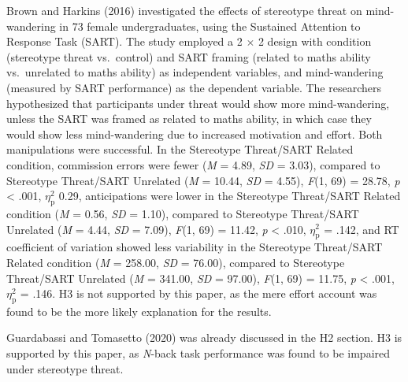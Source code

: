 \documentclass[
  stu, a4paper, 12pt,mask,floatsintext]{apa7}
\begin{document}
Brown and Harkins (2016) investigated the effects of stereotype threat on mind-wandering in 73 female undergraduates, using the Sustained Attention to Response Task (SART).
The study employed a 2 \(\times\) 2 design with condition (stereotype threat vs.~control) and SART framing (related to maths ability vs.~unrelated to maths ability) as independent variables, and mind-wandering (measured by SART performance) as the dependent variable. The researchers hypothesized that participants under threat would show more mind-wandering, unless the SART was framed as related to maths ability, in which case they would show less mind-wandering due to increased motivation and effort.
Both manipulations were successful.
In the Stereotype Threat/SART Related condition, commission errors were fewer (\emph{M} = 4.89, \emph{SD} = 3.03), compared to Stereotype Threat/SART Unrelated (\emph{M} = 10.44, \emph{SD} = 4.55), \emph{F}(1, 69) = 28.78, \emph{p} \textless{} .001, \(\eta^{2}_{\text{p}}\) 0.29, anticipations were lower in the Stereotype Threat/SART Related condition (\emph{M} = 0.56, \emph{SD} = 1.10), compared to Stereotype Threat/SART Unrelated (\emph{M} = 4.44, \emph{SD} = 7.09), \emph{F}(1, 69) = 11.42, \emph{p} \textless{} .010, \(\eta^{2}_{\text{p}}\) = .142, and RT coefficient of variation showed less variability in the Stereotype Threat/SART Related condition (\emph{M} = 258.00, \emph{SD} = 76.00), compared to Stereotype Threat/SART Unrelated (\emph{M} = 341.00, \emph{SD} = 97.00), \emph{F}(1, 69) = 11.75, \emph{p} \textless{} .001, \(\eta^{2}_{\text{p}}\) = .146.
H3 is not supported by this paper, as the mere effort account was found to be the more likely explanation for the results.

Guardabassi and Tomasetto (2020) was already discussed in the H2 section.
H3 is supported by this paper, as \emph{N}-back task performance was found to be impaired under stereotype threat.
\end{document}
